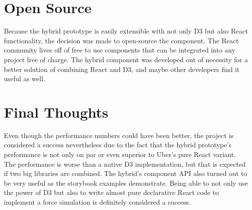 \section{Open Source}

Because the hybrid prototype is easily extensible with not only D3 but also React functionality, the decision was made to open-source the component. The React community lives off of free to use components that can be integrated into any project free of charge. The hybrid component was developed out of necessity for a better solution of combining React and D3, and maybe other developers find it useful as well.

\section{Final Thoughts}

Even though the performance numbers could have been better, the project is considered a success nevertheless due to the fact that the hybrid prototype's performance is not only on par or even superior to Uber's pure React variant. The performance is worse than a native D3 implementation, but that is expected if two big libraries are combined. The hybrid's component API also turned out to be very useful as the storybook examples demonstrate. Being able to not only use the power of D3 but also to write almost pure declarative React code to implement a force simulation is definitely considered a success.







